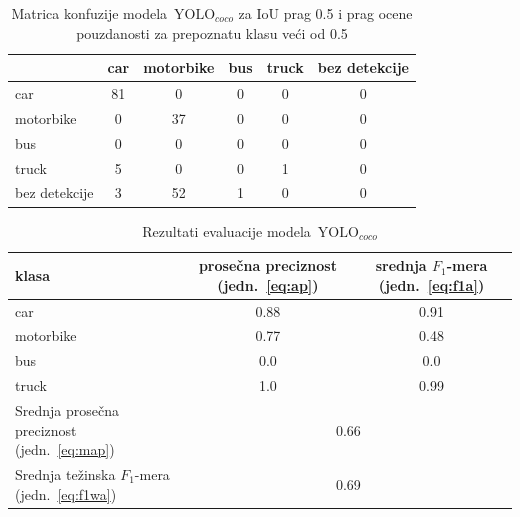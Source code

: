 \documentclass[12pt,oneside]{memoir}
\newcommand{\yolo}{\ensuremath{\,\textrm{YOLO}}}
\begin{document}
\begin{table}
    \begin{center}
    \caption{Matrica konfuzije modela $\yolo_{coco}$ za IoU prag 0.5 i prag ocene pouzdanosti za prepoznatu klasu veći od 0.5 }
    \begin{tabular}{ l|c|c|c|c|c|}
                  & car  & motorbike & bus & truck & bez detekcije \\ \hline
    car           & 81   & 0         & 0   & 0     & 0             \\ 
    motorbike     & 0    & 37        & 0   & 0     & 0             \\ 
    bus           & 0    & 0         & 0   & 0     & 0             \\ 
    truck         & 5    & 0         & 0   & 1     & 0             \\ 
    bez detekcije & 3    & 52        & 1   & 0     & 0             \\ \hline
    \hline
    \end{tabular}
    \label{tab:section4_yolo4base_confusionmatrix}
    \end{center}
\end{table}


\begin{table}
    \begin{center}
    \caption{Rezultati evaluacije modela $\yolo_{coco}$}
        \begin{tabular}{|m{10em}|c|c|}
        \toprule
        klasa     & prosečna preciznost (jedn.~\ref{eq:ap}) & srednja $F_1$-mera (jedn.~\ref{eq:f1a})  \\ \hline
        \midrule
        car       & 0.88  & 0.91 \\ \hline
        motorbike & 0.77  & 0.48 \\ \hline
        bus       & 0.0   & 0.0  \\ \hline
        truck     & 1.0   & 0.99 \\ \hline
        \bottomrule
        Srednja prosečna preciznost (jedn.~\ref{eq:map}) & \multicolumn{2}{c|}{0.66}  \\ \hline
        Srednja težinska $F_1$-mera (jedn.~\ref{eq:f1wa}) & \multicolumn{2}{c|}{0.69}  \\ \hline
    \end{tabular}
    \label{tab:section4_yolo4base_results}
    \end{center}
\end{table}
\end{document}
